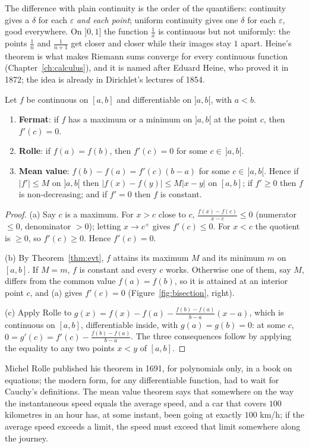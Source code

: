 The difference with plain continuity is the order of the quantifiers: continuity gives a $\delta$ for each $\varepsilon$ \emph{and each point}; uniform continuity
gives one $\delta$ for each $\varepsilon$, good everywhere. On $]0,1]$ the function $\frac1x$ is continuous but not uniformly: the points $\frac1n$ and $\frac1{n+1}$ get
closer and closer while their images stay $1$ apart. Heine's theorem is what makes Riemann sums converge for every continuous function (Chapter~\ref{ch:calculus}), and it
is named after Eduard Heine, who proved it in 1872; the idea is already in Dirichlet's lectures of 1854.

\begin{theorem}\label{thm:mvt}
Let $f$ be continuous on $[a,b]$ and differentiable on $]a,b[$, with $a<b$.
\begin{enumerate}[label=(\alph*)]
\item \textbf{Fermat}: if $f$ has a maximum or a minimum on $]a,b[$ at the point $c$, then $f'(c)=0$.
\item \textbf{Rolle}: if $f(a)=f(b)$, then $f'(c)=0$ for some $c\in\,]a,b[$.
\item \textbf{Mean value}: $f(b)-f(a)=f'(c)(b-a)$ for some $c\in\,]a,b[$. Hence if $|f'|\le M$ on $]a,b[$ then $|f(x)-f(y)|\le M|x-y|$ on $[a,b]$; if $f'\ge0$ then $f$ is non-decreasing; and if $f'=0$ then $f$ is constant.
\end{enumerate}
\end{theorem}
\begin{proof}
(a) Say $c$ is a maximum. For $x>c$ close to $c$, $\frac{f(x)-f(c)}{x-c}\le0$ (numerator $\le0$, denominator $>0$); letting $x\to c^+$ gives $f'(c)\le0$.
For $x<c$ the quotient is $\ge0$, so $f'(c)\ge0$. Hence $f'(c)=0$.

(b) By Theorem~\ref{thm:evt}, $f$ attains its maximum $M$ and its minimum $m$ on $[a,b]$. If $M=m$, $f$ is constant and every $c$ works. Otherwise one of them, say $M$,
differs from the common value $f(a)=f(b)$, so it is attained at an interior point $c$, and (a) gives $f'(c)=0$ (Figure~\ref{fig:bisection}, right).

(c) Apply Rolle to $g(x)=f(x)-f(a)-\frac{f(b)-f(a)}{b-a}(x-a)$, which is continuous on $[a,b]$, differentiable inside, with $g(a)=g(b)=0$: at some $c$,
$0=g'(c)=f'(c)-\frac{f(b)-f(a)}{b-a}$. The three consequences follow by applying the equality to any two points $x<y$ of $[a,b]$.
\end{proof}

Michel Rolle published his theorem in 1691, for polynomials only, in a book on equations; the modern form, for any differentiable function, had to
wait for Cauchy's definitions. The mean value theorem says that somewhere on the way the instantaneous speed equals the average speed, and a car that
covers $100$ kilometres in an hour has, at some instant, been going at exactly $100$ km/h; if the average speed exceeds a limit, the speed must exceed that limit somewhere along the journey.

